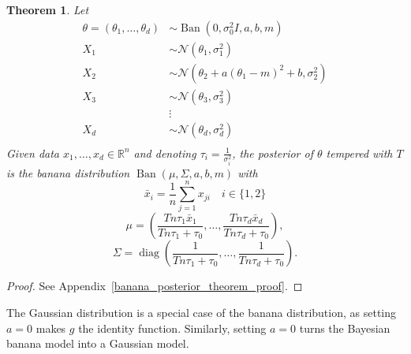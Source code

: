 \documentclass[english,twoside,openright]{HYgraduMLDS}
\newtheorem{theorem}{Theorem}
\newcommand{\R}{\mathbb{R}}
\newcommand{\caln}{{\mathcal{N}}}
\DeclareMathOperator{\ban}{Ban}
\DeclareMathOperator{\diag}{diag}
\begin{document}
\begin{theorem}\label{banana_posterior_theorem}
    Let
    \begin{align*}
        \theta = (\theta_1,\dotsc, \theta_d) &\sim
        \ban(0, \sigma_0^2I, a, b, m) \\
        X_1 &\sim \caln(\theta_1, \sigma_1^2) \\
        X_2 &\sim \caln(\theta_2 + a(\theta_1 - m)^2 + b, \sigma_2^2)\\
        X_3 &\sim \caln(\theta_3, \sigma_3^2) \\
            &\vdots \\
        X_d &\sim \caln(\theta_d, \sigma_d^2) \\
    \end{align*}
    Given data \(x_1,\dotsc, x_d\in \R^n\) and
    denoting \(\tau_i = \frac{1}{\sigma_i^2}\),
    the posterior of \(\theta\) tempered with \(T\) is the banana distribution
    \(\ban(\mu, \Sigma, a, b, m)\)
    with
    \[
        \bar{x}_i = \frac{1}{n}\sum_{j=1}^n x_{ji} \quad i\in \{1, 2\}
    \]
    \[
        \mu = \left(\frac{Tn\tau_1\bar{x}_1}{Tn\tau_1 + \tau_0},\dotsc,
        \frac{Tn\tau_d\bar{x}_d}{Tn\tau_d + \tau_0}\right),
    \]
    \[
        \Sigma = \diag\left(
            \frac{1}{Tn\tau_1 + \tau_0},\dotsc,
            \frac{1}{Tn\tau_d + \tau_0}
        \right).
    \]
\end{theorem}
\begin{proof}
  See Appendix~\ref{banana_posterior_theorem_proof}.
\end{proof}
\setcounter{banana_posterior_theorem_number}{\value{theorem}}

The Gaussian distribution is a special case of the banana distribution,
as setting \(a = 0\) makes \(g\) the identity function. Similarly, setting
\(a = 0\) turns the Bayesian banana model into a Gaussian model.
\end{document}

